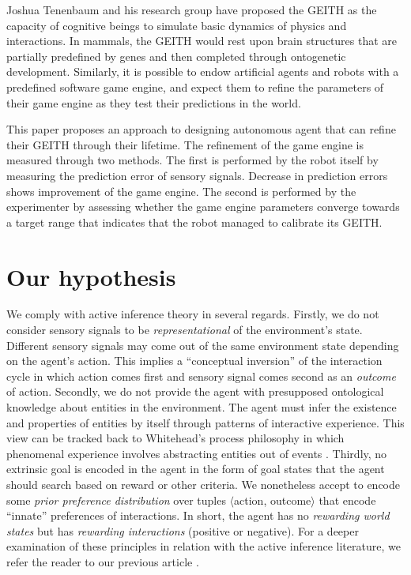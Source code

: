 \documentclass[runningheads]{llncs}
\begin{document}
Joshua Tenenbaum and his research group have proposed the GEITH \cite{battaglia_simulation_2013} as the capacity of cognitive beings to simulate basic dynamics of physics and interactions. 
In mammals, the GEITH would rest upon brain structures that are partially predefined by genes and then completed through ontogenetic development.  
Similarly, it is possible to endow artificial agents and robots with a predefined software game engine, and expect them to refine the parameters of their game engine as they test their predictions in the world.

This paper proposes an approach to designing autonomous agent that can refine their GEITH through their lifetime.
The refinement of the game engine is measured through two methods. 
The first is performed by the robot itself by measuring the prediction error of sensory signals. 
Decrease in prediction errors shows improvement of the game engine. 
The second is performed by the experimenter by assessing whether the game engine parameters converge towards a target range that indicates that the robot managed to calibrate its GEITH. 




\section{Our hypothesis}

We comply with active inference theory in several regards. 
Firstly, we do not consider sensory signals to be \textit{representational} of the environment's state. 
Different sensory signals may come out of the same environment state depending on the agent's action. 
This implies a ``conceptual inversion'' of the interaction cycle in which action comes first and sensory signal comes second as an  \textit{outcome} of action. 
Secondly, we do not provide the agent with presupposed ontological knowledge about entities in the environment. 
The agent must infer the existence and properties of entities by itself through patterns of interactive experience. 
This view can be tracked back to Whitehead's process philosophy in which phenomenal experience involves abstracting entities out of events \cite{whitehead1929}. 
Thirdly, no extrinsic goal is encoded in the agent in the form of goal states that the agent should search based on reward or other criteria. 
We nonetheless accept to encode some \textit{prior preference distribution} over tuples $\langle$action, outcome$\rangle$ that encode ``innate'' preferences of interactions. 
In short, the agent has no \textit{rewarding world states} but has \textit{rewarding interactions} (positive or negative).
For a deeper examination of these principles in relation with the active inference literature, we refer the reader to our previous article \cite{georgeon_artificial_2024}.
\end{document}
